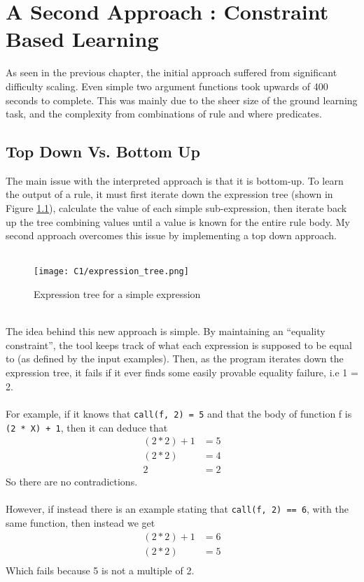 \chapter{A Second Approach : Constraint Based Learning}

As seen in the previous chapter, the initial approach suffered from significant difficulty scaling. Even simple two argument functions took upwards of 400 seconds to complete. This was mainly due to the sheer size of the ground learning task, and the complexity from combinations of rule and where predicates.

\section{Top Down Vs. Bottom Up}
The main issue with the interpreted approach is that it is bottom-up. To learn the output of a rule, it must first iterate down the expression tree (shown in Figure \ref{fig:expr_tree_2}), calculate the value of each simple sub-expression, then iterate back up the tree combining values until a value is known for the entire rule body. My second approach overcomes this issue by implementing a top down approach. \\ \\

\begin{figure}[h!]
\centering
\texttt{[image: C1/expression\_tree.png]}
\caption{Expression tree for a simple expression}
\label{fig:expr_tree_2}
\end{figure}
\mbox{}\\
The idea behind this new approach is simple. By maintaining an ``equality constraint'', the tool keeps track of what each expression is supposed to be equal to (as defined by the input examples). Then, as the program iterates down the expression tree, it fails if it ever finds some easily provable equality failure, i.e 1 = 2. \\ \\
For example, if it knows that \lstinline{call(f, 2) = 5} and that the body of function f is \lstinline{(2 * X) + 1}, then it can deduce that 
\begin{align*}
(2*2) + 1 &= 5 \\
(2*2) &= 4 \\
2 &= 2
\end{align*}
So there are no contradictions. \\ \\
However, if instead there is an example stating that \lstinline{call(f, 2) == 6}, with the same function, then instead we get %
\begin{align*}
(2*2) + 1 &= 6 \\
(2*2) &= 5 \\
\end{align*}
Which fails because 5 is not a multiple of 2.

